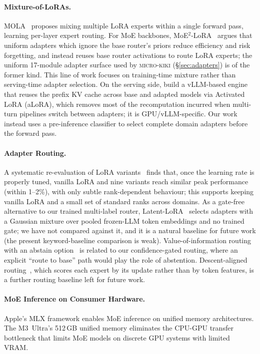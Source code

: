 \documentclass[11pt,a4paper]{article}
\begin{document}
\paragraph{Mixture-of-LoRAs.}
MOLA~\citep{gao2024mola} proposes mixing multiple LoRA experts within a single forward pass, learning per-layer expert routing. For MoE backbones, MoE$^2$-LoRA~\citep{yang2026moe2lora} argues that uniform adapters which ignore the base router's priors reduce efficiency and risk forgetting, and instead reuses base router activations to route LoRA experts; the uniform 17-module adapter surface used by \textsc{micro-kiki} (\S\ref{sec:adapters}) is of the former kind. This line of work focuses on training-time mixture rather than serving-time adapter selection. On the serving side, \citet{activatedlora2024} build a vLLM-based engine that reuses the prefix KV cache across base and adapted models via Activated LoRA (aLoRA), which removes most of the recomputation incurred when multi-turn pipelines switch between adapters; it is GPU/vLLM-specific. Our work instead uses a pre-inference classifier to select complete domain adapters before the forward pass.

\paragraph{Adapter Routing.}
A systematic re-evaluation of LoRA variants~\citep{lora_rank2025} finds that, once the learning rate is properly tuned, vanilla LoRA and nine variants reach similar peak performance (within 1--2\%), with only subtle rank-dependent behaviour; this supports keeping vanilla LoRA and a small set of standard ranks across domains. As a gate-free alternative to our trained multi-label router, Latent-LoRA~\citep{azghan2026latentlora} selects adapters with a Gaussian mixture over pooled frozen-LLM token embeddings and no trained gate; we have not compared against it, and it is a natural baseline for future work (the present keyword-baseline comparison is weak). Value-of-information routing with an abstain option~\citep{saliencro2026voirouting} is related to our confidence-gated routing, where an explicit ``route to base'' path would play the role of abstention. Descent-aligned routing~\citep{nair2026descent}, which scores each expert by its update rather than by token features, is a further routing baseline left for future work.

\paragraph{MoE Inference on Consumer Hardware.}
Apple's MLX framework enables MoE inference on unified memory architectures. The M3~Ultra's 512\,GB unified memory eliminates the CPU-GPU transfer bottleneck that limits MoE models on discrete GPU systems with limited VRAM.
\end{document}
